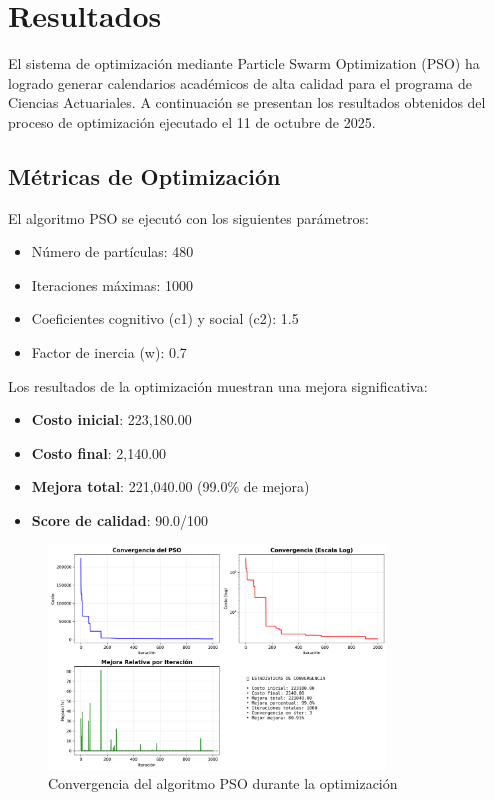 \section{Resultados}

El sistema de optimización mediante Particle Swarm Optimization (PSO) ha logrado generar calendarios académicos de alta calidad para el programa de Ciencias Actuariales. A continuación se presentan los resultados obtenidos del proceso de optimización ejecutado el 11 de octubre de 2025.

\subsection{Métricas de Optimización}

El algoritmo PSO se ejecutó con los siguientes parámetros:
\begin{itemize}
    \item Número de partículas: 480
    \item Iteraciones máximas: 1000
    \item Coeficientes cognitivo (c1) y social (c2): 1.5
    \item Factor de inercia (w): 0.7
\end{itemize}

Los resultados de la optimización muestran una mejora significativa:
\begin{itemize}
    \item \textbf{Costo inicial}: 223,180.00
    \item \textbf{Costo final}: 2,140.00
    \item \textbf{Mejora total}: 221,040.00 (99.0\% de mejora)
    \item \textbf{Score de calidad}: 90.0/100
\end{itemize}

\begin{figure}[htbp]
    \centering
    \includegraphics[width=0.8\textwidth]{../src/course-generator/convergencia_pso.png}
    \caption{Convergencia del algoritmo PSO durante la optimización}
    \label{fig:convergencia_pso}
\end{figure}

